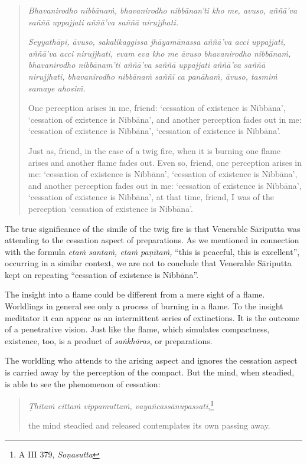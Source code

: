 \begin{quote}
\emph{Bhavanirodho nibbānaṁ, bhavanirodho nibbānan'ti kho me, avuso, aññā'va saññā uppajjati aññā'va saññā nirujjhati.}

\emph{Seyyathāpi, āvuso, sakalikaggissa jhāyamānassa aññā'va acci uppajjati, aññā'va acci nirujjhati, evam eva kho me āvuso bhavanirodho nibbānaṁ, bhavanirodho nibbānam'ti aññā'va saññā uppajjati aññā'va saññā nirujjhati, bhavanirodho nibbānaṁ saññī ca panāhaṁ, āvuso, tasmiṁ samaye ahosiṁ.}

One perception arises in me, friend: `cessation of existence is Nibbāna', `cessation of existence is Nibbāna', and another perception fades out in me: `cessation of existence is Nibbāna', `cessation of existence is Nibbāna'.

Just as, friend, in the case of a twig fire, when it is burning one flame arises and another flame fades out. Even so, friend, one perception arises in me: `cessation of existence is Nibbāna', `cessation of existence is Nibbāna', and another perception fades out in me: `cessation of existence is Nibbāna', `cessation of existence is Nibbāna', at that time, friend, I was of the perception `cessation of existence is Nibbāna'.
\end{quote}

The true significance of the simile of the twig fire is that Venerable Sāriputta was attending to the cessation aspect of preparations. As we mentioned in connection with the formula \emph{etaṁ santaṁ, etaṁ paṇītaṁ,} ``this is peaceful, this is excellent'', occurring in a similar context, we are not to conclude that Venerable Sāriputta kept on repeating ``cessation of existence is Nibbāna''.

The insight into a flame could be different from a mere sight of a flame. Worldlings in general see only a process of burning in a flame. To the insight meditator it can appear as an intermittent series of extinctions. It is the outcome of a penetrative vision. Just like the flame, which simulates compactness, existence, too, is a product of \emph{saṅkhāras}, or preparations.

The worldling who attends to the arising aspect and ignores the cessation aspect is carried away by the perception of the compact. But the mind, when steadied, is able to see the phenomenon of cessation:

\begin{quote}
\emph{Ṭhitaṁ cittaṁ vippamuttaṁ, vayañcassānupassati},\footnote{A III 379, \emph{Soṇasutta}}

the mind steadied and released contemplates its own passing away.
\end{quote}

